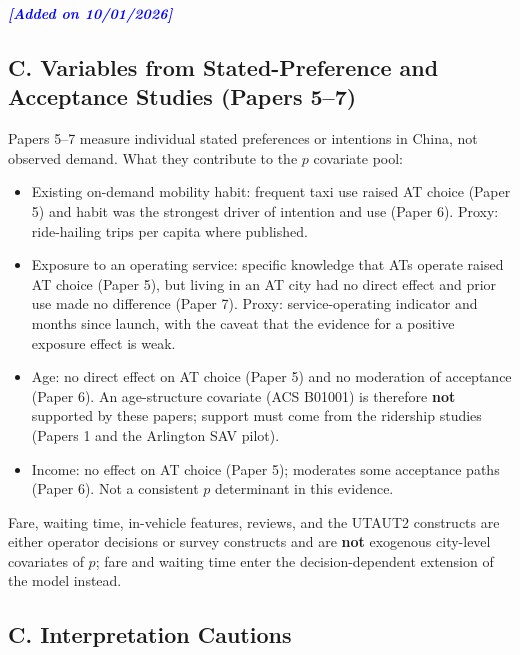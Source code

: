 \documentclass[10pt,a4paper]{article}
\providecommand{\tightlist}{\setlength{\itemsep}{0pt}\setlength{\parskip}{0pt}}
\begin{document}
\textit{\textbf{\textcolor{blue}{[Added on 10/01/2026]}}}
\begin{mdframed}[linecolor=red!60,linewidth=2pt]
\color{blue!100}

\hypertarget{c.-variables-from-stated-preference-and-acceptance-studies}{%
\subsection{C. Variables from Stated-Preference and Acceptance Studies (Papers 5--7)}\label{c.-variables-from-stated-preference-and-acceptance-studies}}

Papers 5--7 measure individual stated preferences or intentions in China, not observed demand. What they contribute to the $p$ covariate pool:

\begin{itemize}
\tightlist
\item
  Existing on-demand mobility habit: frequent taxi use raised AT choice (Paper 5) and habit was the strongest driver of intention and use (Paper 6). Proxy: ride-hailing trips per capita where published.
\item
  Exposure to an operating service: specific knowledge that ATs operate raised AT choice (Paper 5), but living in an AT city had no direct effect and prior use made no difference (Paper 7). Proxy: service-operating indicator and months since launch, with the caveat that the evidence for a positive exposure effect is weak.
\item
  Age: no direct effect on AT choice (Paper 5) and no moderation of acceptance (Paper 6). An age-structure covariate (ACS B01001) is therefore \textbf{not} supported by these papers; support must come from the ridership studies (Papers 1 and the Arlington SAV pilot).
\item
  Income: no effect on AT choice (Paper 5); moderates some acceptance paths (Paper 6). Not a consistent $p$ determinant in this evidence.
\end{itemize}

Fare, waiting time, in-vehicle features, reviews, and the UTAUT2 constructs are either operator decisions or survey constructs and are \textbf{not} exogenous city-level covariates of $p$; fare and waiting time enter the decision-dependent extension of the model instead.

\end{mdframed}
\hypertarget{c.-interpretation-cautions}{%
\subsection{C. Interpretation Cautions}\label{c.-interpretation-cautions}}
\end{document}
